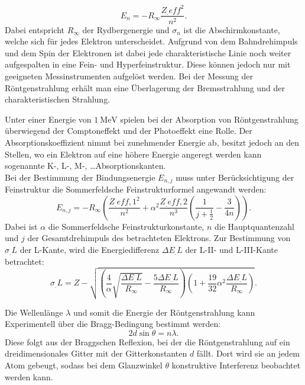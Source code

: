 \begin{equation}
E_n = -R_\infty\frac{Z_.{eff}^2}{n^2}\text{.}\label{eq:E_n}
\end{equation}  
Dabei entspricht $R_\infty$ der Rydbergenergie und $\sigma_n$ ist die Abschirmkonstante, welche sich für jedes Elektron unterscheidet. 
Aufgrund von dem Bahndrehimpuls und dem Spin der Elektronen ist dabei jede charakteristische Linie noch weiter aufgespalten in eine Fein- und Hyperfeinstruktur. Diese können jedoch nur mit geeigneten Messinstrumenten aufgelöst werden.
Bei der Messung der Röntgenstrahlung erhält man eine Überlagerung der Bremsstrahlung und der charakteristischen Strahlung.


\noindent Unter einer Energie von $\SI{1}{\mega\electronvolt}$ spielen bei der Absorption von Röntgenstrahlung überwiegend der Comptoneffekt und der Photoeffekt eine Rolle.
Der Absorptionskoeffizient nimmt bei zunehmender Energie ab, besitzt jedoch an den Stellen, wo ein Elektron auf eine höhere Energie angeregt werden kann sogenannte K-, L-, M-, \dots Absorptionskanten.\\
Bei der Bestimmung der Bindungsenergie $E_{n,j}$ muss unter Berücksichtigung der Feinstruktur die Sommerfeldsche Feinstrukturformel angewandt werden:
\begin{equation}
E_{n,j} = -R_\infty\left(\frac{Z_.{eff,1}^2}{n^2}+\alpha^2\frac{Z_.{eff,2}}{n^3}\left(\frac{1}{j+\frac{1}{2}}-\frac{3}{4n}\right)\right)\text{.}
\end{equation}
Dabei ist $\alpha$ die Sommerfeldsche Feinstrukturkonstante, $n$ die Hauptquantenzahl und $j$ der Gesamtdrehimpuls des betrachteten Elektrons.
Zur Bestimmung von $\sigma_.L$ der L-Kante, wird die Energiedifferenz $\Delta E_.L$ der L-II- und L-III-Kante betrachtet:
\begin{equation}
\sigma_.L = Z-\sqrt{\left(\frac{4}{\alpha}\sqrt{\frac{\Delta E_.L}{R_\infty}}-\frac{5\Delta E_.L}{R_\infty}\right)\left(1+\frac{19}{32}\alpha^2\frac{\Delta E_.L}{R_\infty}\right)}\text{.}\label{eq:sigma_L}
\end{equation}

\noindent Die Wellenlänge $\lambda$ und somit die Energie der Röntgenstrahlung kann Experimentell über die Bragg-Bedingung bestimmt werden:
\begin{equation}
2d\sin\theta = n\lambda\text{.}\label{eq:Bragg}
\end{equation}
Diese folgt aus der Braggschen Reflexion, bei der die Röntgenstrahlung auf ein dreidimensionales Gitter mit der Gitterkonstanten $d$ fällt. Dort wird sie an jedem Atom gebeugt, sodass bei dem Glanzwinkel $\theta$ konstruktive Interferenz beobachtet werden kann.